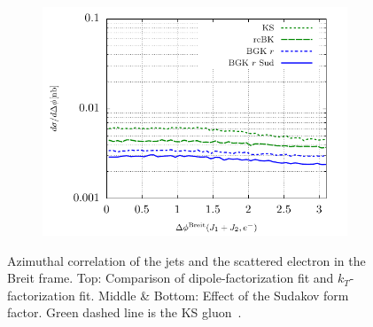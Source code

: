 \documentclass[11pt]{article}
\numberwithin{equation}{section}
\numberwithin{table}{section}
\numberwithin{figure}{section}
\begin{document}
\begin{figure}[p]
\begin{subfigure}{0.5\textwidth}
	\end{subfigure}
	\begin{subfigure}{0.5\textwidth}
	\includegraphics[width=\textwidth]{plots/plotBGK3}
	\end{subfigure}
	\caption{\footnotesize Azimuthal correlation of the jets and the scattered electron in the Breit frame. Top: Comparison of dipole-factorization fit and $k_T$-factorization fit. Middle \& Bottom: Effect of the Sudakov form factor.   Green dashed line is the KS gluon~\cite{vanHameren:2021sqc}.}
	\label{fig:je-breit}
\end{figure}
\end{document}
